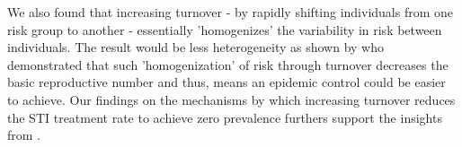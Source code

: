We also found that increasing turnover - by rapidly shifting individuals from one
risk group to another - essentially 'homogenizes'					%
the variability in risk between individuals.							%
The result would be less heterogeneity as shown by							%
 \citet{Henry2015} who demonstrated that 
such 'homogenization' of risk through turnover
decreases the basic reproductive number and thus, means an 
epidemic control could be easier to achieve. 
Our findings on the mechanisms by which increasing turnover			%
reduces the STI treatment rate to achieve zero prevalence 
furthers support the insights from \citet{Henry2015}.

